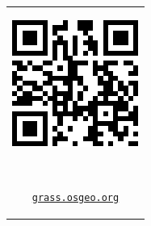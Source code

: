 \documentclass[25pt, margin=0mm, innermargin=15mm, blockverticalspace=15mm, colspace=15mm, subcolspace=8mm]{tikzposter}
\begin{document}
\begin{columns}
{\bigskip

\vspace{0.2cm}

\textcolor{gray}{
\hrulefill
}

\vspace{0.1cm}

\newcommand{\qrcodesize}{0.05\linewidth}


\begin{center}
\begin{tabular}{c}


\begin{minipage}{\qrcodesize}
\includegraphics[width=\textwidth]{./images/qr_grass.pdf}
\end{minipage}
~
\begin{minipage}{0.15\linewidth}
\small {\href{http://grass.osgeo.org}{\nolinkurl{grass.osgeo.org}}}
\end{minipage}


\end{tabular}
\end{center}}
\end{columns}
\end{document}
